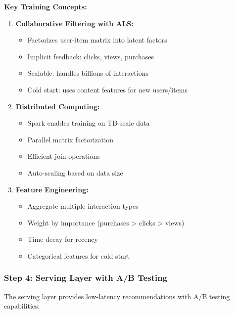 \textbf{Key Training Concepts:}

\begin{enumerate}
    \item \textbf{Collaborative Filtering with ALS:}
    \begin{itemize}
        \item Factorizes user-item matrix into latent factors
        \item Implicit feedback: clicks, views, purchases
        \item Scalable: handles billions of interactions
        \item Cold start: uses content features for new users/items
    \end{itemize}

    \item \textbf{Distributed Computing:}
    \begin{itemize}
        \item Spark enables training on TB-scale data
        \item Parallel matrix factorization
        \item Efficient join operations
        \item Auto-scaling based on data size
    \end{itemize}

    \item \textbf{Feature Engineering:}
    \begin{itemize}
        \item Aggregate multiple interaction types
        \item Weight by importance (purchases > clicks > views)
        \item Time decay for recency
        \item Categorical features for cold start
    \end{itemize}
\end{enumerate}

\subsubsection*{Step 4: Serving Layer with A/B Testing}

The serving layer provides low-latency recommendations with A/B testing capabilities:

